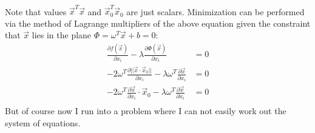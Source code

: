 \documentclass{article}
\newcommand{\1}{\mathbf{1}}
\begin{document}
\begin{enumerate}
\begin{footnotesize}
\begin{align*}
	\end{align*} 
	Note that values $\vec x^T \vec x$ and $\vec x_0^T \vec x_0$ are just scalars. Minimization can be performed via the method of Lagrange multipliers of the above equation given the constraint that $\vec x$ lies in the plane $\Phi = \omega^T\vec x +b =0$:
	\begin{align*}
	    \frac{\partial f(\vec x)}{\partial x_i} - \lambda \frac{\partial \Phi(\vec x)}{\partial x_i} &= 0 \\
	    -2\omega^T\frac{\partial ||\vec x\cdot\vec x_0||}{\partial x_i} - \lambda\omega^T \frac{\partial \vec x}{\partial x_i} &= 0 \\
	    -2\omega^T\frac{\partial \vec x}{\partial x_i}\cdot\vec x_0 - \lambda\omega^T\frac{\partial \vec x}{\partial x_i} &= 0 \\
	\end{align*}
	But of course now I run into a problem where I can not easily work out the system of equations. 
	\end{footnotesize}
\end{enumerate}
\end{document}

